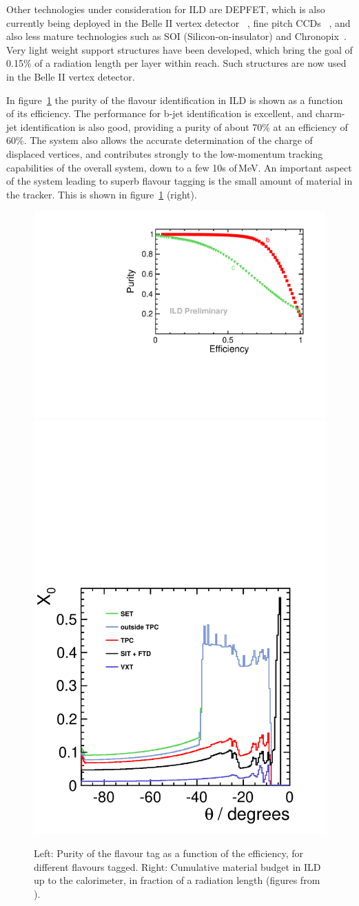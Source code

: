 \documentclass[%
 amsmath,amssymb,
 aps,
 longbibliography,
]{revtex4-1}
\begin{document}
Other technologies under consideration for ILD are DEPFET, which is also currently being deployed in the Belle II vertex detector ~\cite{Luetticke:2017zpx}, fine pitch CCDs ~\cite{fineCCD}, and also less mature technologies such as SOI (Silicon-on-insulator) and Chronopix~\cite{RDliaision}.
Very light weight support structures have been developed, which bring the goal of 0.15\% of a radiation length per layer within reach. Such structures are now used in the Belle II vertex detector.

In figure~\ref{fig-btag} the purity of the flavour identification in ILD is shown as a function of its efficiency.
The performance for b-jet identification is excellent, and charm-jet identification is also good, providing a purity of about 70\% at an efficiency of 60\%.
 The system also allows the accurate determination of the charge of displaced vertices, and contributes strongly to the low-momentum tracking capabilities of the overall system, down to a few 10s of\,MeV. An important aspect of the system leading to superb flavour tagging is the small amount of material in the tracker. This is shown in figure~\ref{fig-btag} (right).
\begin{figure}
    \centering
    \includegraphics[width=0.45\hsize]{figures/flavour_tag_v02-00-02_btagctag.pdf}
    \includegraphics[width=0.35\hsize]{figures/material-budget-new.pdf}
    \caption{Left: Purity of the flavour tag as a function of the efficiency, for different flavours tagged. Right: Cumulative material budget in ILD up to the calorimeter, in fraction of a radiation length (figures from \cite{LCWS2018}).}
    \label{fig-btag}
\end{figure}  
\end{document}
